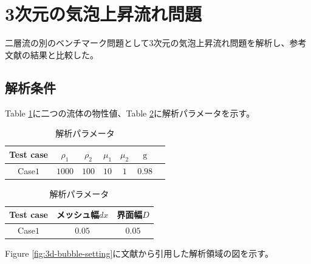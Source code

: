 \documentclass[8pt,a4paper]{article}
\begin{document}
\newpage
\section{3次元の気泡上昇流れ問題}

二層流の別のベンチマーク問題として3次元の気泡上昇流れ問題を解析し、参考文献の結果と比較した。

\subsection{解析条件}

Table \ref{table:3d-bubble-material-property}に二つの流体の物性値、Table \ref{table:3d-bubble-parameter}に解析パラメータを示す。

\renewcommand{\arraystretch}{1}
\begin{table}[H]
	\centering
	\caption{解析パラメータ}
	\begin{tabular}{ccccccc}
		\hline
		Test case & $\rho_1$ & $\rho_2$ & $\mu_1$ & $\mu_2$ & $\mathrm{g}$\\
		\hline 
		Case$1$ & $1000$ & $100$ & $10$ & $1$   & $0.98$ \\
		\hline         
	\end{tabular}
	\label{table:3d-bubble-material-property}
\end{table}
\renewcommand{\arraystretch}{1.0}

\renewcommand{\arraystretch}{1}
\begin{table}[H]
	\centering
	\caption{解析パラメータ}
	\begin{tabular}{ccc}
		\hline
		Test case & メッシュ幅$dx$ & 界面幅$D$\\
		\hline 
		Case$1$ & $0.05$ & $0.05$\\
		\hline         
	\end{tabular}
	\label{table:3d-bubble-parameter}
\end{table}
\renewcommand{\arraystretch}{1.0}

Figure \ref{fig:3d-bubble-setting}に文献\cite{Safi2017}から引用した解析領域の図を示す。
\end{document}
